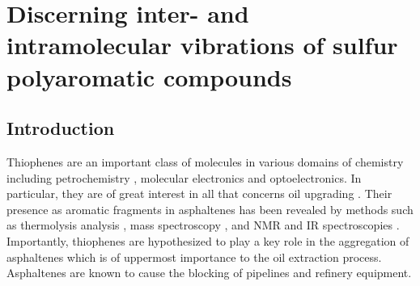 \chapter[Discerning inter- and intramolecular vibrations of sulfur polyaromatic compounds]{Discerning inter- and intramolecular vibrations of sulfur polyaromatic compounds}
\minitoc
\restoregeometry

	\newpage
	
	\section{Introduction}
	
	Thiophenes are an important class of molecules in various domains of chemistry including petrochemistry \cite{waldo1991sulfur,mitra1998determination,lobodin2015separation},  molecular electronics \cite{katz2004recent,ong2008thiophene,vivas2011linear,silva2011controlling} and optoelectronics\cite{kim2010one}. In particular, they are of great interest in all that concerns oil upgrading \cite{kishita2003upgrading,samokhvalov2011heterogeneous,chen2015acylation}. Their presence as aromatic fragments in asphaltenes has been revealed by methods such as thermolysis analysis \cite{strausz1992molecular}, mass spectroscopy \cite{liu2010molecular,karimi2011quantitative},  and NMR and IR spectroscopies \cite{coelho2012elucidation,alhumaidan2016impact}. Importantly, thiophenes are hypothesized to play a key role in the aggregation of asphaltenes \cite{widany2001electronic,liu2014adjusting} which is of uppermost importance to the oil extraction process. Asphaltenes are known to cause the blocking of pipelines and refinery equipment.\\
	
